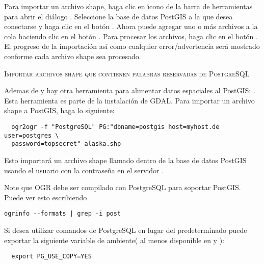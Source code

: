 Para importar un archivo shape, haga clic en \'{\i}cono de la barra de herramientas  para abrir el di\'alogo . Seleccione la base de datos PostGIS a la que desea conectarse y haga clic en el bot\'on . Ahora puede agregar uno o más archivos a la cola haciendo clic en el bot\'on   . Para procesar los archivos, haga clic en el bot\'on  
. El progreso de la importaci\'on as\'{i} como cualquier error/advertencia ser\'a mostrado conforme cada archivo shape sea procesado.

\begin{Tip}\caption{\textsc{Importar archivos shape que contienen
palabras reservadas de PostgreSQL}}
\end{Tip} 

Ademas de  y  hay otra herramienta para alimentar datos espaciales al PostGIS: . Esta herramienta es parte de la instalaci\'on de GDAL.
Para importar un archivo shape a PostGIS, haga lo siguiente:
\begin{verbatim}
  ogr2ogr -f "PostgreSQL" PG:"dbname=postgis host=myhost.de user=postgres \
  password=topsecret" alaska.shp
\end{verbatim}

Esto importar\'a un archivo shape  llamado  dentro de la base de datos PostGIS
\usertext{postgis}
usando el usuario  con la contrase\~na  en el servidor
\server{myhost.de}.

Note que OGR debe ser compilado con PostgreSQL para soportar PostGIS.
Puede ver esto escribiendo
\begin{verbatim}
ogrinfo --formats | grep -i post
\end{verbatim}

Si desea utilizar comandos  de PostgreSQL  en lugar del predeterminado
\filename{INSERT INTO} puede exportar la siguiente variable de ambiente( al menos disponible en \nix y \osx):
\begin{verbatim}
  export PG_USE_COPY=YES
\end{verbatim}

